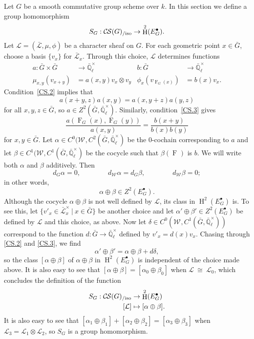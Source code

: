 \documentclass[10pt]{amsart}
\theoremstyle{plain}
\theoremstyle{definition}
\theoremstyle{remark}
\newcommand{\EE}{\mathbb{\bar Q}_\ell}
\newcommand{\Fq}{k}
\newcommand{\EEx}{\EE^\times}
\newcommand{\Weil}[1]{\mathcal{W}_{#1}}
\newcommand{\Frob}[1]{\operatorname{F}_{#1}}
\DeclareMathOperator{\Hh}{H}
\newcommand{\tq}{{\ \vert\ }}
\newcommand{\iso}{{\ \cong\ }}
\newcommand{\cs}[1]{{\mathcal{#1}}}
\newcommand{\gcs}[1]{{\mathcal{\bar #1}}}
\newcommand{\CS}{{\mathcal{C\hskip-0.8pt S}}}
\newcommand{\CSiso}[1]{\CS(#1)_{/\text{iso}}}
\newcommand{\bG}{\bar{G}}
\begin{document}
Let $G$ be a smooth commutative group scheme over $\Fq$.
In this section we define a group homomorphism
\[
S_G : \CSiso{G} \to \Hh^2(E^\bullet_G).
\] 
Let $\cs{L} = (\gcs{L},\mu,\phi)$ be a character sheaf on $G$.
For each geometric point $x\in \bG$, choose a basis $\{ v_x \}$ for $\gcs{L}_x$.
Through this choice, $\cs{L}$ determines functions
\begin{align*}
a : \bG\times \bG &\to \EEx & b : \bG &\to \EEx \\
\mu_{x,y}(v_{x+y}) &= a(x,y) v_x \otimes v_y & \phi_x(v_{\Frob{G}(x)}) &= b(x) v_x.
\end{align*}
Condition~\ref{CS.2} implies that
\begin{equation}\label{2-cocyle}
a(x+y,z) a(x,y) = a(x,y+z) a(y,z)
\end{equation}
for all $x,y,z\in \bG$, so $a \in Z^2(\bG,\EEx)$.  Similarly, condition~\ref{CS.3} gives
\begin{equation}\label{nohom}
\frac{a(\Frob{G}(x),\Frob{G}(y))}{a(x,y)} =  \frac{b(x+y)}{b(x) b(y)}
\end{equation}
for $x, y \in \bG$.
Let $\alpha \in C^0(\Weil{},C^2(\bG,\EEx)$ be the $0$-cochain corresponding to $a$ and let $\beta\in C^1(\Weil{},C^1(\bG,\EEx)$ be the cocycle such that $\beta(\Frob{})$ is $b$.  We will write both $\alpha$ and $\beta$ additively.
Then
\[
d_G\alpha =0, \qquad\qquad
d_{\Weil{}} \alpha = d_{G} \beta,\qquad\qquad
d_{\Weil{}} \beta =0;
\]
in other words,
\[\alpha\oplus \beta \in Z^2(E^\bullet_G).\]
Although the cocycle $\alpha\oplus \beta$ is not well defined by $\cs{L}$, its class in $\Hh^2(E^\bullet_G)$ is.
To see this, let $\{ v'_x \in \gcs{L}_x^\times \tq x \in \bG\}$ be another choice and let $\alpha'\oplus \beta' \in Z^2(E^\bullet_G)$ be defined by $\cs{L}$ and this choice, as above.
Now let $\delta \in C^0(\Weil{},C^1(\bG,\EEx))$ correspond to the function $d : \bG\to \EEx$ defined by $v'_x = d(x) v_x$.
Chasing through \ref{CS.2} and \ref{CS.3}, we find
\[
\alpha'\oplus\beta' = \alpha\oplus\beta + d\delta,
\]
so the class $[\alpha\oplus\beta]$ of $\alpha\oplus\beta$ in $\Hh^2(E^\bullet_G)$ is independent of the choice made above. It is also easy to see that $[\alpha\oplus\beta] = [\alpha_0\oplus\beta_0]$ when $\cs{L} \iso \cs{L}_0$,
which concludes the definition of the function
\begin{align*}
S_G : \CSiso{G} &\to \Hh^2(E^\bullet_G)\\
[\cs{L}] &\mapsto [\alpha\oplus \beta].
\end{align*}
It is also easy to see that $[\alpha_1\oplus\beta_1] + [\alpha_2\oplus\beta_2] = [\alpha_3\oplus\beta_3]$ when $\cs{L}_3 = \cs{L}_1\otimes \cs{L}_2$, so $S_G$ is a group homomorphism.
\end{document}

